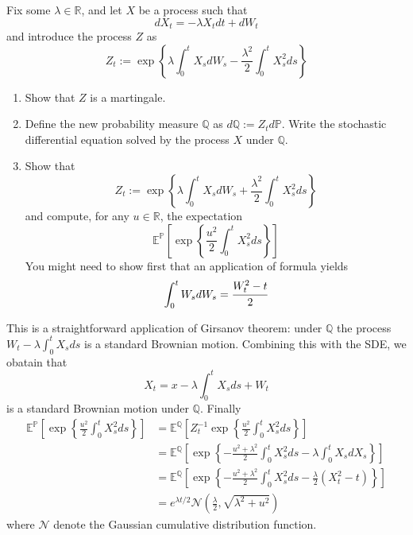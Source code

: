 \documentclass[12pt,a4paper]{exam}
\begin{document}
\begin{questions}
\question Fix some $\lambda\in\mathbb{R}$, and let $X$ be a process such that
\begin{equation*}
dX_t = -\lambda X_t dt + dW_t
\end{equation*}
and introduce the process $Z$ as 
\begin{equation*}
Z_t := \exp\left\{\lambda\int_0^t X_s dW_s - \frac{\lambda^2}{2}\int_0^t X_s^2 ds\right\}
\end{equation*}
\begin{enumerate}[label=(\alph*),font=\itshape]
\item Show that $Z$ is a martingale.
\item Define the new probability measure $\mathbb{Q}$ as $d\mathbb{Q}:=Z_td\mathbb{P}$. Write the stochastic differential equation solved by the process $X$ under $\mathbb{Q}$.
\item Show that 
\begin{equation*}
Z_t := \exp\left\{\lambda\int_0^t X_s dW_s + \frac{\lambda^2}{2}\int_0^t X_s^2 ds\right\}
\end{equation*}
and compute, for any $u\in\mathbb{R}$, the expectation
\begin{equation*}
\mathbb{E}^{\mathbb{P}}\left[\exp\left\{\frac{u^2}{2}\int_0^t X_s^2 ds\right\}\right]
\end{equation*}
You might need to show first that an application of \ito formula yields
\begin{equation*}
\int_0^t W_s dW_s = \cfrac{W_t^2-t}{2}
\end{equation*}
\end{enumerate}
\fillwithlines{3cm}

\begin{solution}
This is a straightforward application of Girsanov theorem: under $\mathbb{Q}$ the process $W_t -\lambda\int_0^tX_s ds$ is a standard Brownian motion. Combining this with the SDE, we obatain that 
\begin{equation*}
X_t = x -\lambda\int_0^t X_s ds + W_t
\end{equation*}
is a standard Brownian motion under $\mathbb{Q}$. Finally
\begin{equation*}
\begin{aligned}
\mathbb{E}^{\mathbb{P}}\left[\exp\left\{\frac{u^2}{2}\int_0^t X_s^2 ds\right\}\right] &= \mathbb{E}^{\mathbb{Q}}\left[Z_t^{-1}\exp\left\{\frac{u^2}{2}\int_0^t X_s^2 ds\right\}\right] \\
 &= \mathbb{E}^{\mathbb{Q}}\left[\exp\left\{-\frac{u^2+\lambda^2}{2}\int_0^t X_s^2 ds-\lambda\int_0^t X_s dX_s \right\}\right] \\
 &= \mathbb{E}^{\mathbb{Q}}\left[\exp\left\{-\frac{u^2+\lambda^2}{2}\int_0^t X_s^2 ds-\frac{\lambda}{2}(X_t^2-t)\right\}\right] \\
 &= e^{\lambda t/2}\mathcal{N}\left(\frac{\lambda}{2}, \sqrt{\lambda^2 + u^2}\right)
\end{aligned}
\end{equation*}
where $\mathcal{N}$ denote the Gaussian cumulative distribution function.
\end{solution}


\end{questions}
\end{document}
